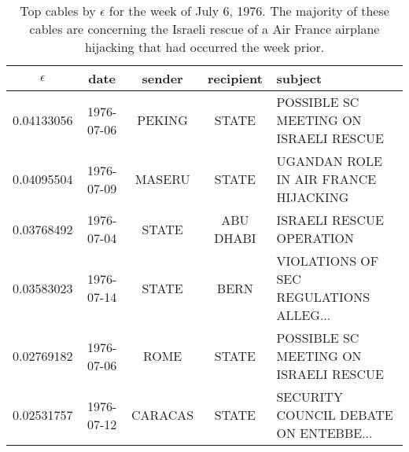 \begin{table*}
\centering
\begin{tabular}{ccccl}
\toprule
$\epsilon$ & date & sender & recipient & subject \\
\midrule
0.04133056 & 1976-07-06 & PEKING & STATE & POSSIBLE SC MEETING ON ISRAELI RESCUE \\
0.04095504 & 1976-07-09 & MASERU & STATE & UGANDAN ROLE IN AIR FRANCE HIJACKING \\
0.03768492 & 1976-07-04 & STATE & ABU DHABI & ISRAELI RESCUE OPERATION \\
0.03583023 & 1976-07-14 & STATE & BERN & VIOLATIONS OF SEC REGULATIONS ALLEG... \\
0.02769182 & 1976-07-06 & ROME & STATE & POSSIBLE SC MEETING ON ISRAELI RESCUE \\ %
0.02531757 & 1976-07-12 & CARACAS & STATE & SECURITY COUNCIL DEBATE ON ENTEBBE...\\%
\bottomrule
\end{tabular}
\label{tab:entebbe}
\caption{Top cables by $\epsilon$ for the week of July 6, 1976.  The majority of these cables are concerning the Israeli rescue of a Air France airplane hijacking that had occurred the week prior.}
\end{table*}





